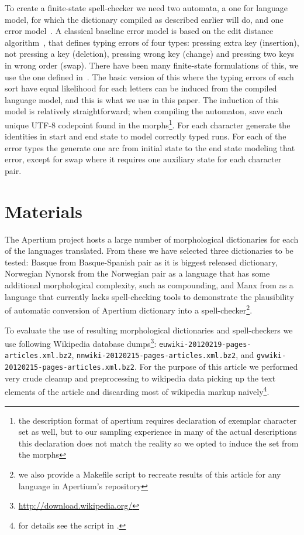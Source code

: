 \documentclass[10pt,a4paper]{article}
\begin{document}
To create a finite-state spell-checker we need two automata, a one for language
model, for which the dictionary compiled as described earlier will do, and one
error model~\cite{pirinen/2010/lrec}. A classical baseline error model is based
on the edit distance algorithm~\cite{levenshtein/1966,damerau/1964}, that
defines typing errors of four types: pressing extra key (insertion), not
pressing a key (deletion), pressing wrong key (change) and pressing two keys in
wrong order (swap). There have been many finite-state formulations of this, we
use the one defined in~\cite{schulz/2002,pirinen/2010/lrec}. The basic version
of this where the typing errors of each sort have equal likelihood for each
letters can be induced from the compiled language model, and this is what we
use in this paper. The induction of this model is relatively straightforward;
when compiling the automaton, save each unique UTF-8 codepoint found in the
morphs\footnote{the description format of apertium requires declaration of
exemplar character set as well, but to our sampling experience in many of the
actual descriptions this declaration does not match the reality so we opted to
induce the set from the morphs}. For each character generate the identities in
start and end state to model correctly typed runs. For each of the error types
the generate one arc from initial state to the end state modeling that error,
except for swap where it requires one auxiliary state for each character pair.



\section{Materials}
\label{sec:materials}

The Apertium project hosts a large number of morphological dictionaries for
each of the languages translated. From these we have selected three
dictionaries to be tested: Basque from Basque-Spanish pair as it is biggest
released dictionary, Norwegian Nynorsk from the Norwegian pair as a language
that has some additional morphological complexity, such as compounding, and
Manx from  as a language that currently lacks spell-checking tools to
demonstrate the plausibility of automatic conversion of Apertium dictionary
into a spell-checker\footnote{we also provide a Makefile script to
recreate results of this article for any language in Apertium's repository}.

To evaluate the use of resulting morphological dictionaries and spell-checkers
we use following Wikipedia database 
dumps\footnote{\url{http://download.wikipedia.org/}}: 
\texttt{euwiki-20120219-pages-articles.xml.bz2}, 
\texttt{nnwiki-20120215-pages-articles.xml.bz2},
and \texttt{gvwiki-20120215-pages-articles.xml.bz2}. For the purpose of this
article we performed very crude cleanup and preprocessing to wikipedia data
picking up the text elements of the article and discarding most of wikipedia
markup naively\footnote{for details see the script in .}.
\end{document}

